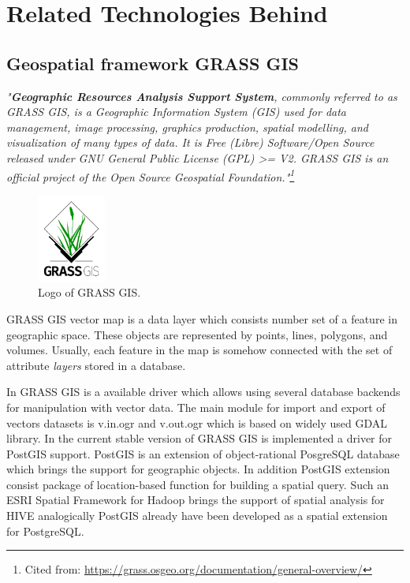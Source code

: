 \documentclass[a4paper,12pt,oneside]{report}
\begin{document}
	
    
\section{Related Technologies Behind}
    \subsection{Geospatial framework GRASS GIS}

\textit{"\textbf{Geographic Resources Analysis Support System}, 
commonly referred to as GRASS GIS, is a Geographic Information System (GIS) used for
 data management, image processing, graphics production, 
spatial modelling, and visualization of many types of data. It is Free (Libre) Software/Open
 Source released under GNU General Public License 
(GPL) >= V2. GRASS GIS is an official project of the Open Source Geospatial Foundation."\footnote{Cited from:
 \url{https://grass.osgeo.org/documentation/general-overview/}}}

 \begin{figure}[!htbp]
    \centering
    \includegraphics[width=0.2\textwidth]{./img/grasslogo.png}
    \caption[Logo GRASS]{\centering Logo of GRASS GIS.}
 \end{figure}   
GRASS GIS vector map is a data layer which consists number set of a feature in geographic space. 
These objects are represented by points, lines, polygons, and volumes. Usually, each feature in the 
map is somehow connected with the set of attribute \textit{layers} stored in a database. 

In GRASS GIS is a available driver which allows using several database backends for manipulation 
with vector data. The main module for import and export of vectors datasets is v.in.ogr and v.out.ogr 
which is based on widely used GDAL library. 
In the current stable version of GRASS GIS is implemented a driver for PostGIS support. PostGIS is 
an extension of object-rational PosgreSQL database which brings the support for geographic objects. 
In addition PostGIS extension consist package of 
location-based function for building a spatial query. Such an ESRI Spatial Framework for Hadoop 
brings the support of spatial analysis for HIVE analogically PostGIS 
already have been developed as a spatial extension for PostgreSQL.  
\end{document}
